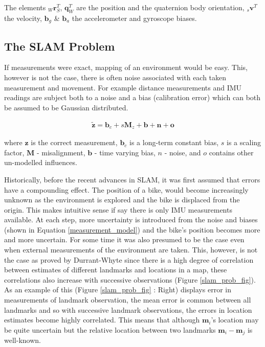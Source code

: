 \documentclass[11pt,twoside]{report}
\begin{document}
The elements $_{W}\textbf{r}_{S}^{T}$, $\textbf{{q}}_{W}^{T}$ are the position and the quaternion body orientation, $_{s}\textbf{{v}}^{T}$ the velocity, $\textbf{{b}}_{g}$ \& $\textbf{{b}}_{a}$ the accelerometer and gyroscope biases.


\subsection{The SLAM Problem}

If measurements were exact, mapping of an environment would be easy. This, however is not the case, there is often noise associated with each taken measurement and movement. For example distance measurements and IMU readings are subject both to a noise and a bias (calibration error) which can both be assumed to be Gaussian distributed.

\begin{equation}
\begin{aligned}
\mathbf{\tilde{z}} = \textbf{b}_{c} + s\textbf{M}_{z} + \textbf{b} + \textbf{n} + \textbf{o}
\end{aligned}
\label{measurement_model}
\end{equation}

where $\textbf{z}$ is the correct measurement, $\textbf{b}_{c}$ is a long-term constant bias, $s$ is a scaling factor, $\textbf{M}$ - misalignment, $\textbf{b}$ - time varying bias, $n$ - noise, and $o$ contains other un-modelled influences.

Historically, before the recent advances in SLAM, it was first assumed that errors have a compounding effect. The position of a bike, would become increasingly unknown as the environment is explored and the bike is displaced from the origin. This makes intuitive sense if say there is only IMU measurements available. At each step, more uncertainty is introduced from the noise and biases (shown in Equation \ref{measurement_model}) and the bike's position becomes more and more uncertain. 
\newline \newline
For some time it was also presumed to be the case even when external measurements of the environment are taken. This, however, is not the case as proved by Durrant-Whyte \cite{F_Durr_1} since there is a high degree of correlation between estimates of different landmarks and locations in a map, these correlations also increase with successive observations (Figure \ref{slam_prob_fig}). As an example of this (Figure \ref{slam_prob_fig} : Right) displays error in measurements of landmark observation, the mean error is common between all landmarks and so with successive landmark observations, the errors in location estimates become highly correlated. This means that although $\textbf{m}_{i}$'s location may be quite uncertain but the relative location between two landmarks $\textbf{m}_{i}-\textbf{m}_{j}$ is well-known.\newline
\end{document}
